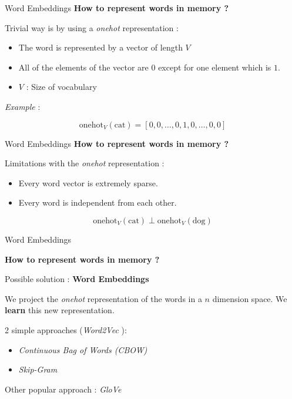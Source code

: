 \documentclass[aspectratio=169]{beamer}
\begin{document}
\begin{frame}{Word Embeddings}
\centering
\textbf{How to represent words in memory ?}
\vspace{.3cm}

\raggedright
Trivial way is by using a \textit{onehot} representation : 

\begin{itemize}
	\item The word is represented by a vector of length $V$
	\item All of the elements of the vector are $0$ except for one element which is $1$.
	\item $V$ : Size of vocabulary
\end{itemize}

\textit{Example} : 

$$
\mathrm{onehot}_V (\mathrm{cat}) = \left[0, 0, \dots, 0, 1, 0, \dots, 0, 0 \right]
$$

\end{frame}

\begin{frame}{Word Embeddings}
\centering
\textbf{How to represent words in memory ?}
\vspace{.3cm}

\raggedright
Limitations with the \textit{onehot} representation : 

\begin{itemize}
	\item Every word vector is extremely sparse.
	\item Every word is independent from each other.
\end{itemize}

$$
\mathrm{onehot}_V (\mathrm{cat}) \perp \mathrm{onehot}_V (\mathrm{dog})
$$

\end{frame}

\begin{frame}{Word Embeddings}

\centering
\textbf{How to represent words in memory ?}
\vspace{.3cm}

\raggedright
Possible solution : \textbf{Word Embeddings}
\vspace{.3cm}

We project the \textit{onehot} representation of the words in a $n$ dimension space. We \textbf{learn} this new representation.
\vspace{.5cm}

2 simple approaches (\textit{Word2Vec} \cite{mikolov2013distributed, mikolov2013efficient}):
\begin{itemize}
	\item \textit{Continuous Bag of Words (CBOW)}
	\item \textit{Skip-Gram}
\end{itemize}

Other popular approach : \textit{GloVe} \cite{pennington2014glove}

\end{frame}
\end{document}
